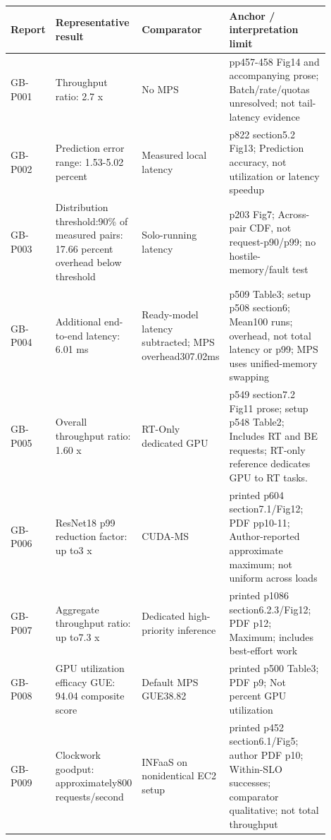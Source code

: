 \documentclass[12pt,a4paper]{article}
\begin{document}
{\small\begin{longtable}{>{\raggedright\arraybackslash}p{0.1\linewidth}>{\raggedright\arraybackslash}p{0.24\linewidth}>{\raggedright\arraybackslash}p{0.23\linewidth}>{\raggedright\arraybackslash}p{0.33\linewidth}}
\toprule
Report & Representative result & Comparator & Anchor /\allowbreak{} interpretation limit\\\midrule
\endhead
GB-P001 & Throughput ratio:\allowbreak{} 2.7 x & No MPS & pp457-458 Fig14 and accompanying prose; Batch/\allowbreak{}rate/\allowbreak{}quotas unresolved; not tail-latency evidence\\
GB-P002 & Prediction error range:\allowbreak{} 1.53-5.02 percent & Measured local latency & p822 section5.2 Fig13; Prediction accuracy, not utilization or latency speedup\\
GB-P003 & Distribution threshold:\allowbreak{}90\% of measured pairs:\allowbreak{} 17.66 percent overhead below threshold & Solo-running latency & p203 Fig7; Across-pair CDF, not request-p90/\allowbreak{}p99; no hostile-memory/\allowbreak{}fault test\\
GB-P004 & Additional end-to-end latency:\allowbreak{} 6.01 ms & Ready-model latency subtracted; MPS overhead307.02ms & p509 Table3; setup p508 section6; Mean100 runs; overhead, not total latency or p99; MPS uses unified-memory swapping\\
GB-P005 & Overall throughput ratio:\allowbreak{} 1.60 x & RT-Only dedicated GPU & p549 section7.2 Fig11 prose; setup p548 Table2; Includes RT and BE requests; RT-only reference dedicates GPU to RT tasks.\\
GB-P006 & ResNet18 p99 reduction factor:\allowbreak{} up to3 x & CUDA-MS & printed p604 section7.1/\allowbreak{}Fig12; PDF pp10-11; Author-reported approximate maximum; not uniform across loads\\
GB-P007 & Aggregate throughput ratio:\allowbreak{} up to7.3 x & Dedicated high-priority inference & printed p1086 section6.2.3/\allowbreak{}Fig12; PDF p12; Maximum; includes best-effort work\\
GB-P008 & GPU utilization efficacy GUE:\allowbreak{} 94.04 composite score & Default MPS GUE38.82 & printed p500 Table3; PDF p9; Not percent GPU utilization\\
GB-P009 & Clockwork goodput:\allowbreak{} approximately800 requests/\allowbreak{}second & INFaaS on nonidentical EC2 setup & printed p452 section6.1/\allowbreak{}Fig5; author PDF p10; Within-SLO successes; comparator qualitative; not total throughput\\

\end{longtable}}
\end{document}
